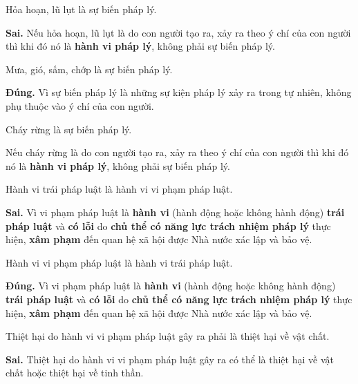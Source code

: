\begin{ques}
Hỏa hoạn, lũ lụt là sự biến pháp lý.
\end{ques}
\begin{ans}
\textbf{Sai.} Nếu hỏa hoạn, lũ lụt là do con người tạo ra, xảy ra theo ý chí của con người thì khi đó nó là \textbf{hành vi pháp lý}, không phải sự biến pháp lý.
\end{ans}

\begin{ques}
Mưa, gió, sấm, chớp là sự biến pháp lý.
\end{ques}
\begin{ans}
\textbf{Đúng.} Vì sự biến pháp lý là những sự kiện pháp lý xảy ra trong tự nhiên, không phụ thuộc vào ý chí của con người.
\end{ans}

\begin{ques}
Cháy rừng là sự biến pháp lý.
\end{ques}
\begin{ans}
Nếu cháy rừng là do con người tạo ra, xảy ra theo ý chí của con người thì khi đó nó là \textbf{hành vi pháp lý}, không phải sự biến pháp lý.
\end{ans}

\begin{ques}
Hành vi trái pháp luật là hành vi vi phạm pháp luật.
\end{ques}
\begin{ans}
\textbf{Sai.} Vì vi phạm pháp luật là \textbf{hành vi} (hành động hoặc không hành động) \textbf{trái pháp luật} và \textbf{có lỗi} do \textbf{chủ thể có năng lực trách nhiệm pháp lý} thực hiện, \textbf{xâm phạm} đến quan hệ xã hội được Nhà nước xác lập và bảo vệ.
\end{ans}

\begin{ques}
Hành vi vi phạm pháp luật là hành vi trái pháp luật.
\end{ques}
\begin{ans}
\textbf{Đúng.} Vì vi phạm pháp luật là \textbf{hành vi} (hành động hoặc không hành động) \textbf{trái pháp luật} và \textbf{có lỗi} do \textbf{chủ thể có năng lực trách nhiệm pháp lý} thực hiện, \textbf{xâm phạm} đến quan hệ xã hội được Nhà nước xác lập và bảo vệ.
\end{ans}

\begin{ques}
Thiệt hại do hành vi vi phạm pháp luật gây ra phải là thiệt hại về vật chất.
\end{ques}
\begin{ans}
\textbf{Sai.} Thiệt hại do hành vi vi phạm pháp luật gây ra có thể là thiệt hại về vật chất hoặc thiệt hại về tinh thần.
\end{ans}

